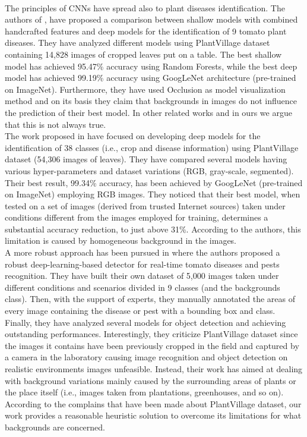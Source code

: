 \\\indent
The principles of CNNs have spread also to plant diseases identification. The authors of \cite{tunisia}, have proposed a comparison between shallow models with combined handcrafted features and deep models for the identification of 9 tomato plant diseases. They have analyzed different models using PlantVillage dataset containing 14,828 images of cropped leaves put on a table. The best shallow model has achieved 95.47\% accuracy using Random Forests, while the best deep model has achieved 99.19\% accuracy using GoogLeNet architecture (pre-trained on ImageNet). Furthermore, they have used Occlusion \cite{occlusion} as model visualization method and on its basis they claim that backgrounds in images do not influence the prediction of their best model. In other related works and in ours we argue that this is not always true.
\\\indent
The work proposed in \cite{erba} have focused on developing deep models for the identification of 38 classes (i.e., crop and disease information) using PlantVillage dataset (54,306 images of leaves). They have compared several models having various hyper-parameters and dataset variations (RGB, gray-scale, segmented). Their best result, 99.34\% accuracy, has been achieved by GoogLeNet (pre-trained on ImageNet) employing RGB images. They noticed that their best model, when tested on a set of images (derived from trusted Internet sources) taken under conditions different from the images employed for training, determines a substantial accuracy reduction, to just above 31\%. According to the authors, this limitation is caused by homogeneous background in the images.
\\\indent
A more robust approach has been pursued in \cite{manzoni} where the authors proposed a robust deep-learning-based detector for real-time tomato diseases and pests recognition. They have built their own dataset of 5,000 images taken under different conditions and scenarios divided in 9 classes (and the backgrounds class). Then, with the support of experts, they manually annotated the areas of every image containing the disease or pest with a bounding box and class. Finally, they have analyzed several models for object detection and achieving outstanding performances. Interestingly, they criticize PlantVillage dataset since the images it contains have been previously cropped in the field and captured by a camera in the laboratory causing image recognition and object detection on realistic environments images unfeasible. Instead, their work has aimed at dealing with background variations mainly caused by the surrounding areas of plants or the place itself (i.e., images taken from plantations, greenhouses, and so on).
\\\indent
According to the complains that have been made about PlantVillage dataset, our work provides a reasonable heuristic solution to overcome its limitations for what backgrounds are concerned.
